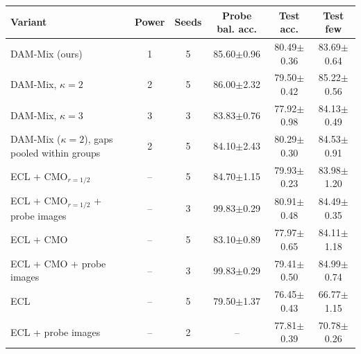 \begin{tabular}{l c c c c c}
\toprule
Variant & Power & Seeds & Probe bal. acc. & Test acc. & Test few \\
\midrule
DAM-Mix (ours) & 1 & 5 & 85.60{\scriptsize$\pm$0.96} & 80.49{\scriptsize$\pm$0.36} & 83.69{\scriptsize$\pm$0.64} \\
DAM-Mix, $\kappa=2$ & 2 & 5 & 86.00{\scriptsize$\pm$2.32} & 79.50{\scriptsize$\pm$0.42} & 85.22{\scriptsize$\pm$0.56} \\
DAM-Mix, $\kappa=3$ & 3 & 3 & 83.83{\scriptsize$\pm$0.76} & 77.92{\scriptsize$\pm$0.98} & 84.13{\scriptsize$\pm$0.49} \\
DAM-Mix ($\kappa=2$), gaps pooled within groups & 2 & 5 & 84.10{\scriptsize$\pm$2.43} & 80.29{\scriptsize$\pm$0.30} & 84.53{\scriptsize$\pm$0.91} \\
ECL + CMO$_{r=1/2}$ & -- & 5 & 84.70{\scriptsize$\pm$1.15} & 79.93{\scriptsize$\pm$0.23} & 83.98{\scriptsize$\pm$1.20} \\
ECL + CMO$_{r=1/2}$ + probe images & -- & 3 & 99.83{\scriptsize$\pm$0.29} & 80.91{\scriptsize$\pm$0.48} & 84.49{\scriptsize$\pm$0.35} \\
ECL + CMO & -- & 5 & 83.10{\scriptsize$\pm$0.89} & 77.97{\scriptsize$\pm$0.65} & 84.11{\scriptsize$\pm$1.18} \\
ECL + CMO + probe images & -- & 3 & 99.83{\scriptsize$\pm$0.29} & 79.41{\scriptsize$\pm$0.50} & 84.99{\scriptsize$\pm$0.74} \\
ECL & -- & 5 & 79.50{\scriptsize$\pm$1.37} & 76.45{\scriptsize$\pm$0.43} & 66.77{\scriptsize$\pm$1.15} \\
ECL + probe images & -- & 2 & -- & 77.81{\scriptsize$\pm$0.39} & 70.78{\scriptsize$\pm$0.26} \\
\bottomrule
\end{tabular}
